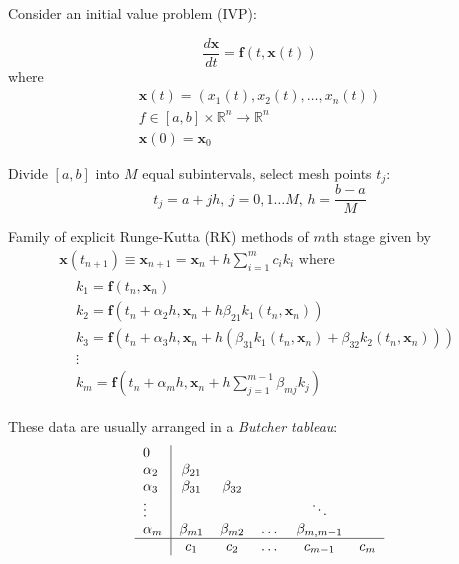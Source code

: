 \documentclass[10pt]{amsart}
\begin{document}
\begin{multicols*}{2}
Consider an initial value problem (IVP):

\begin{equation}
	\frac{d\mathbf{x}}{dt} = \mathbf{f}(t, \mathbf{x}(t)) 
\end{equation}
where
\[
\begin{gathered}
	\mathbf{x}(t) = (x_1(t), x_2(t), \dots, x_n(t)) \\
	f\in [a,b] \times \mathbb{R}^n \to \mathbb{R}^n \\
	\mathbf{x}(0) = \mathbf{x}_0
\end{gathered}
\]

Divide $[a,b]$ into $M$ equal subintervals, select mesh points $t_j$:
\[
t_j = a+ jh, \, j = 0, 1\dots M, \, h = \frac{b-a}{M}
\]

Family of explicit Runge-Kutta (RK) methods of $m$th stage given by
\begin{equation}\label{Eq:ERKmethodsMthStage}
\begin{gathered}
	\mathbf{x}(t_{n+1}) \equiv \mathbf{x}_{n+1} = \mathbf{x}_n + h \sum_{i=1}^m c_i k_i \text{ where } \\
	\begin{aligned}
		& k_1 = \mathbf{f}(t_n, \mathbf{x}_n) \\
		& k_2 = \mathbf{f}(t_n + \alpha_2 h, \mathbf{x}_n + h\beta_{21} k_1(t_n, \mathbf{x}_n)) \\
		& k_3 = \mathbf{f}(t_n + \alpha_3 h, \mathbf{x}_n + h( \beta_{31} k_1(t_n, \mathbf{x}_n) + \beta_{32} k_2(t_n, \mathbf{x}_n))) \\
		& \vdots \\
		& k_m = \mathbf{f}(t_n + \alpha_m h, \mathbf{x}_n + h \sum_{j=1}^{m-1} \beta_{mj}k_j)
	\end{aligned}
\end{gathered}
\end{equation}

These data are usually arranged in a \emph{Butcher tableau}:
\[
\begin{tabular}{ l|c c c c c }
	0 & & & & & \\
	$\alpha_2$ & $\beta_{21}$ &  & & & \\ 
	$\alpha_3$ & $\beta_{31}$ & $\beta_{32}$ & & & \\ 
	$\vdots$ &  & & & $\ddots$ & \\ 
	$\alpha_m$ & $\beta_{m1}$ & $\beta_{m2}$ & \dots & $\beta_{m, m-1}$ & \\
	\hline 
	& $c_1$ & $c_2$ & \dots & $c_{m-1}$ & $c_m$ \\
\end{tabular}
\]



\end{multicols*}
\end{document}
